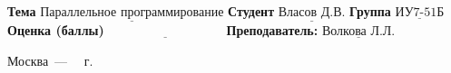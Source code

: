 \begin{titlepage}
      \noindent\textbf{Тема} $\underline{\text{Параллельное программирование}}$\newline\newline
      \noindent\textbf{Студент} $\underline{\text{Власов Д.В.}}$\newline\newline
      \noindent\textbf{Группа} $\underline{\text{ИУ7-51Б}}$\newline\newline
      \noindent\textbf{Оценка (баллы)} $\underline{\text{~~~~~~~~~~~~~~~~~~~~~~~~~~~}}$\newline\newline
      \noindent\textbf{Преподаватель: } $\underline{\text{Волкова Л.Л.}}$\newline\newline\newline
      
      \begin{center}
          \vfill
          Москва~---~\the\year
          ~г.
      \end{center}
  \end{titlepage}
  